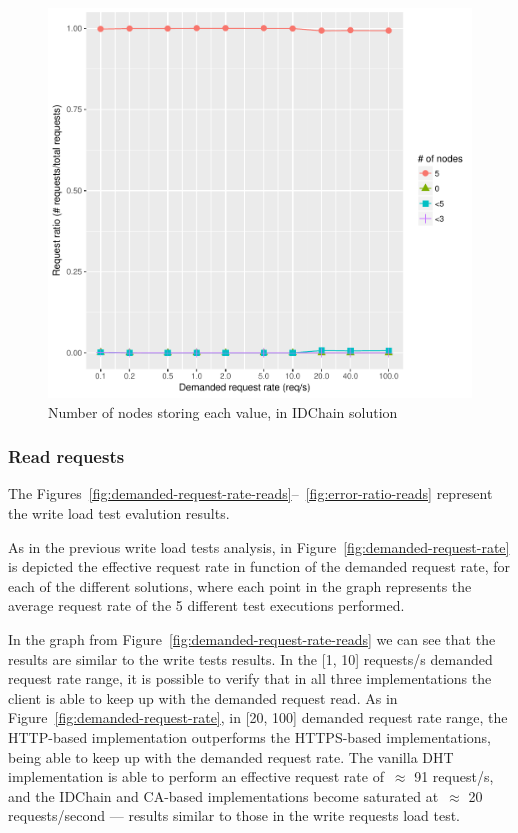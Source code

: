 \begin{figure}[H]
  \centering
  \includegraphics[scale=0.4]{Figures/evaluation/stored-ratio-https-bc.pdf}
  \caption{Number of nodes storing each value, in IDChain solution}
\label{fig:stored-ratio-https-bc}
\end{figure}

\subsubsection{Read requests}

The Figures~\ref{fig:demanded-request-rate-reads}–~\ref{fig:error-ratio-reads} represent the write load test evalution results.

As in the previous write load tests analysis, in Figure~\ref{fig:demanded-request-rate} is depicted the effective request rate in function of the demanded request rate, for each of the different solutions, where each point in the graph represents the average request rate of the 5 different test executions performed.

In the graph from Figure~\ref{fig:demanded-request-rate-reads} we can see that the results are similar to the write tests results.
In the [1, 10] requests/s demanded request rate range, it is possible to verify that in all three implementations the client is able to keep up with the demanded request read.
As in Figure~\ref{fig:demanded-request-rate}, in [20, 100] demanded request rate range, the HTTP-based implementation outperforms the HTTPS-based implementations, being able to keep up with the demanded request rate.
The vanilla DHT implementation is able to perform an effective request rate of~$\approx$ 91 request/s, and the IDChain and CA-based implementations become saturated at~$\approx$ 20 requests/second — results similar to those in the write requests load test.

